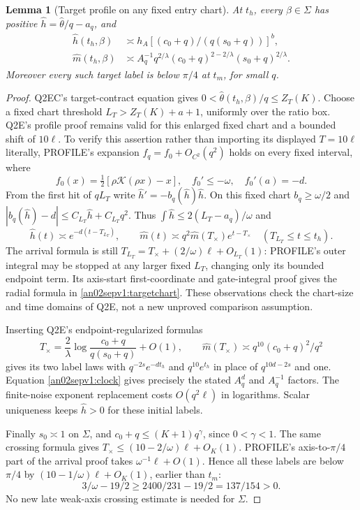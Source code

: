 \documentclass[11pt]{article}
\newtheorem{lemma}[theorem]{Lemma}
\theoremstyle{remark}\newtheorem{remark}[theorem]{Remark}
\newcommand{\Kfun}{\mathcal K}
\begin{document}
\begin{lemma}[Target profile on any fixed entry chart]
\label{an02sepv1:target}
At $t_h$, every $\beta\in\Sigma$ has positive
$\widehat h=\widehat\theta/q-a_q$, and
\begin{align*}
 \widehat h(t_h,\beta)&\asymp h_A
          [(c_0+q)/(q(s_0+q))]^b,\\
 \widehat m(t_h,\beta)&\asymp A_q^{-1}q^{2/\lambda}
          (c_0+q)^{2-2/\lambda}(s_0+q)^{2/\lambda}.
\end{align*}
Moreover every such target label is below $\pi/4$ at $t_m$,
for small $q$.
\end{lemma}
\begin{proof}
Q2EC's target-contract equation gives
$0<\widehat\theta(t_h,\beta)/q\le Z_T(K)$.
Choose a fixed chart threshold $L_T>Z_T(K)+a+1$, uniformly
over the ratio box. Q2E's profile proof remains valid for
this enlarged fixed chart and a bounded shift of $10\ell$.
To verify this assertion rather than importing its displayed
$T=10\ell$ literally, PROFILE's expansion
$f_q=f_0+O_{C^2}(q^2)$ holds on every fixed interval, where
\[
 f_0(x)=\tfrac12[\rho\Kfun(\rho x)-x],\quad
 f_0'\le-\omega,\quad f_0'(a)=-d.
\]
From the first hit of $qL_T$ write
$\widehat h'=-b_q(\widehat h)\widehat h$.
On this fixed chart $b_q\ge\omega/2$ and
$|b_q(\widehat h)-d|\le C_{L_T}\widehat h+C_{L_T}q^2$.
Thus $\int\widehat h\le2(L_T-a_q)/\omega$ and
\begin{equation}
 \widehat h(t)\asymp e^{-d(t-T_{L_T})},\qquad
 \widehat m(t)\asymp q^2\widehat m(T_\times)e^{t-T_\times}
 \quad(T_{L_T}\le t\le t_h).
 \label{an02sepv1:targetchart}
\end{equation}
The arrival formula is still
$T_{L_T}=T_\times+(2/\omega)\ell+O_{L_T}(1)$:
PROFILE's outer integral may be stopped at any larger fixed
$L_T$, changing only its bounded endpoint term. Its axis-start
first-coordinate and gate-integral proof gives the radial
formula in \eqref{an02sepv1:targetchart}. These observations
check the chart-size and time domains of Q2E, not a new
unproved comparison assumption.

Inserting Q2E's endpoint-regularized formulas
\[
 T_\times=\frac2\lambda\log\frac{c_0+q}{q(s_0+q)}+O(1),\qquad
 \widehat m(T_\times)\asymp q^{10}(c_0+q)^2/q^2
\]
gives its two label laws with $q^{-2s}e^{-dt_h}$ and
$q^{10}e^{t_h}$ in place of $q^{10d-2s}$ and one.
Equation \eqref{an02sepv1:clock} gives precisely the stated
$A_q^d$ and $A_q^{-1}$ factors. The finite-noise exponent
replacement costs $O(q^2\ell)$ in logarithms. Scalar uniqueness
keeps $\widehat h>0$ for these initial labels.

Finally $s_0\asymp1$ on $\Sigma$, and
$c_0+q\le (K+1)q^\gamma$, since $0<\gamma<1$.
The same crossing formula gives
$T_\times\le(10-2/\omega)\ell+O_K(1)$.
PROFILE's axis-to-$\pi/4$ part of the arrival proof takes
$\omega^{-1}\ell+O(1)$. Hence all these labels are below
$\pi/4$ by $(10-1/\omega)\ell+O_K(1)$, earlier than $t_m$:
\[
 3/\omega-19/2\ge 2400/231-19/2=137/154>0.
\]
No new late weak-axis crossing estimate is needed for $\Sigma$.
\end{proof}
\end{document}
